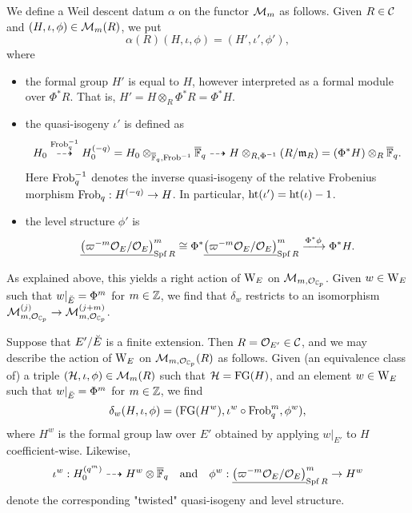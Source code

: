 \documentclass[../main.tex]{subfiles}
\begin{document}
We define a Weil descent datum $\alpha$ on the functor $\mathcal{M}_m$ as follows. 
Given $R\in \mathcal{C}$ and $(H, \iota, \phi) \in \mathcal{M}_m(R)$, we put
\begin{equation*}
  \alpha(R) \left( H, \iota, \phi \right) = (H', \iota',\phi'),
\end{equation*}
where
\begin{itemize}
  \item the formal group $H'$ is equal to $H$, however interpreted as a formal
    module over $\Phi^*R$. That is, $H' = H \otimes_{R} \Phi^* R = \Phi^* H$.
  \item the quasi-isogeny $\iota'$ is defined as
    \begin{equation*}
      H_0 \overset{\mathrm{Frob}_q^{-1}}{\dashrightarrow} H_0^{(-q)} = H_0
      \otimes_{\overline {\mathbb{F}}_q, \mathrm{Frob}^{-1}}
      \overline {\mathbb{F}}_q \dashrightarrow H \otimes_{R, \Phi^{-1}} (R/\mathfrak{m}_R) = (\Phi^*
      H) \otimes_R \overline {\mathbb{F}}_q.
    \end{equation*}
    Here $\mathrm{Frob}_q^{-1}$ denotes the inverse quasi-isogeny of the relative
    Frobenius morphism $\mathrm{Frob}_q: H^{(-q)} \to H$. In particular, 
    $\textnormal{ht}(\iota') = \textnormal{ht}(\iota)-1$.
  \item the level structure $\phi'$ is
    \begin{equation*}
      \underline{\left({\varpi^{-m}\mathcal{O}_E}/{\mathcal{O}_E} \right)}^m_{\operatorname{Spf} R}
      \cong \Phi^* \underline{\left({\varpi^{-m}\mathcal{O}_E}/{\mathcal{O}_E} \right)}^m_{\operatorname{Spf} R}
      \xrightarrow{\Phi^* \phi} \Phi^* H.
    \end{equation*}
\end{itemize}

As explained above, this yields a right action of $\mathrm W_E$ on $\mathcal{M}_{m, \mathcal{O}_{\mathbb{C}_p}}$.
Given $w \in \mathrm W_E$ such that $w|_{\breve {E}} = \Phi^m$ for $m \in \mathbb{Z}$, we find
that $\delta_w$ restricts to an isomorphism $\mathcal{M}_{m, \mathcal{O}_{\mathbb{C}_p}}^{(j)} \to \mathcal{M}_{m,
\mathcal{O}_{\mathbb{C}_p}}^{(j+m)}$. 

\begin{xpl}
  Suppose that $E'/{\breve {E}}$ is a finite extension. Then $R = \mathcal{O}_{E'} \in \mathcal{C}$, 
  and we may describe the action of $\mathrm W_E$ on 
  $\mathcal{M}_{m, \mathcal{O}_{\mathbb{C}_p}}(R)$ as follows. Given (an equivalence class of)
  a triple $(\mathcal{H}, \iota, \phi) \in \mathcal{M}_m(R)$ such that 
  $\mathcal{H} = \textnormal{FG}(H)$, and an element $w \in \mathrm W_E$ such that 
  $w|_{{\breve {E}}} = \Phi^m$ for $m \in \mathbb{Z}$, we find 
  $$\delta_w(H, \iota, \phi) = (\textnormal{FG}(H^w), \iota^w \circ \mathrm{Frob}_q^m, \phi^w),$$ 
  where $H^w$ is the formal group law over $E'$ obtained by applying 
  $w|_{E'}$ to $H$ coefficient-wise. Likewise, 
  $$\iota^w: H_0^{(q^m)} \dashrightarrow H^w \otimes \overline {\mathbb{F}}_q
  \quad \text{and} \quad
  \phi^w:  \underline{\left({\varpi^{-m}\mathcal{O}_E}/{\mathcal{O}_E} \right)}^m_{\operatorname{Spf} R}
      \to H^w$$
  denote the corresponding "twisted" quasi-isogeny and level structure.
\end{xpl}
\end{document}
